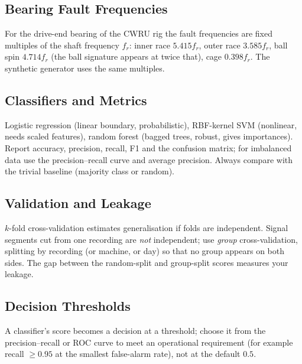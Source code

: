 \documentclass[11pt,a4paper]{article}
\begin{document}
\subsection{Bearing Fault Frequencies}
For the drive-end bearing of the CWRU rig the fault frequencies are fixed multiples of the shaft frequency $f_r$: inner race $5.415f_r$, outer race $3.585f_r$, ball spin $4.714f_r$ (the ball signature appears at twice that), cage $0.398f_r$. The synthetic generator uses the same multiples.

\subsection{Classifiers and Metrics}
Logistic regression (linear boundary, probabilistic), RBF-kernel SVM (nonlinear, needs scaled features), random forest (bagged trees, robust, gives importances). Report accuracy, precision, recall, F1 and the confusion matrix; for imbalanced data use the precision--recall curve and average precision. Always compare with the trivial baseline (majority class or random).

\subsection{Validation and Leakage}
$k$-fold cross-validation estimates generalisation if folds are independent. Signal segments cut from one recording are \emph{not} independent; use \emph{group} cross-validation, splitting by recording (or machine, or day) so that no group appears on both sides. The gap between the random-split and group-split scores measures your leakage.

\subsection{Decision Thresholds}
A classifier's score becomes a decision at a threshold; choose it from the precision--recall or ROC curve to meet an operational requirement (for example recall $\ge0.95$ at the smallest false-alarm rate), not at the default $0.5$.
\end{document}
